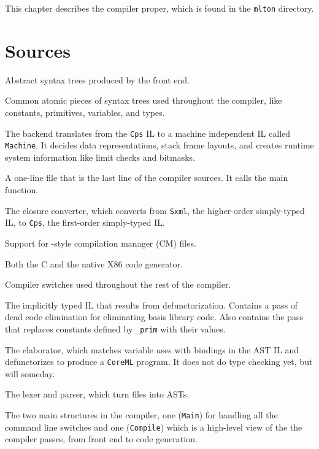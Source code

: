 
This chapter describes the compiler proper, which is found in the {\tt mlton}
directory.

\section{Sources}

\begin{description}

Abstract syntax trees produced by the front end.

Common atomic pieces of syntax trees used throughout the compiler, like
constants, primitives, variables, and types.

The backend translates from the {\tt Cps} IL to a machine independent IL called
{\tt Machine}.  It decides data representations, stack frame layouts, and creates
runtime system information like limit checks and bitmasks.

A one-line file that is the last line of the compiler sources.  It calls the
main function.

The closure converter, which converts from {\tt Sxml}, the higher-order
simply-typed IL, to {\tt Cps}, the first-order simply-typed IL.

Support for {\smlnj}-style compilation manager (CM) files.

Both the C and the native X86 code generator.

Compiler switches used throughout the rest of the compiler.

The implicitly typed IL that results from defunctorization.  Contains a
pass of dead code elimination for eliminating basis library code.  Also contains
the pass that replaces constants defined by {\tt \_prim} with their values.

The elaborator, which matches variable uses with bindings in the AST IL and
defunctorizes to produce a {\tt CoreML} program.  It does not do type checking
yet, but will someday. 

The lexer and parser, which turn files into ASTs.

The two main structures in the compiler, one ({\tt Main}) for handling all the
command line switches and one ({\tt Compile}) which is a high-level view of the
the compiler passes, from front end to code generation.


\end{description}
